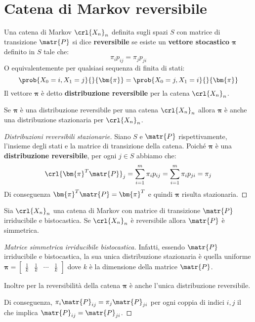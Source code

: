 \documentclass[\main/main.tex]{subfiles}
\begin{document}
\section{Catena di Markov reversibile}
\begin{definition}
  Una catena di Markov \(\crl{X_n}_n\) definita sugli spazi \(S\) con matrice di transizione \(\matr{P}\) si dice \textbf{reversibile} se esiste un \textbf{vettore stocastico} \(\bm{\pi} \) definito in \(S\) tale che:
  \[
    \pi_i p_{ij} = \pi_j p_{ji}
  \]
  O equivalentemente per qualsiasi sequenza di finita di stati:
  \[
    \prob{X_0 = i, X_1 = j}{}{\bm{\pi}} = \prob{X_0 = j, X_1 = i}{}{\bm{\pi}}
  \]
  Il vettore \(\bm{\pi} \) è detto \textbf{distribuzione reversibile} per la catena \(\crl{X_n}_n\).
\end{definition}

\begin{theorem}
  Se \(\bm{\pi} \) è una distribuzione reversibile per una catena \(\crl{X_n}_n\) allora \(\bm{\pi} \) è anche una distribuzione stazionaria per \(\crl{X_n}_n\).
\end{theorem}
\begin{proof}[Distribuzioni reversibili stazionarie]
  Siano \(S\) e \(\matr{P}\) rispettivamente, l'insieme degli stati e la matrice di transizione della catena. Poiché \(\bm{\pi} \) è una \textbf{distribuzione reversibile}, per ogni \(j \in S\) abbiamo che:
  \[
    \crl{\bm{\pi}^T \matr{P}}_j = \sum_{i=1}^m \pi_i p_{ij} = \sum_{i=1}^m \pi_i p_{ji} = \pi_j
  \]
  Di conseguenza \(\bm{\pi}^T \matr{P} = \bm{\pi}^T\) e quindi \(\bm{\pi} \) risulta stazionaria.
\end{proof}

\begin{theorem}
  Sia \(\crl{X_n}_n\) una catena di Markov con matrice di transizione \(\matr{P}\) irriducibile e bistocastica. Se \(\crl{X_n}_n\) è reversibile allora \(\matr{P}\) è simmetrica.
\end{theorem}
\begin{proof}[Matrice simmetrica irriducibile bistocastica]
  Infatti, essendo \(\matr{P}\) irriducibile e bistocastica, la sua unica distribuzione stazionaria è quella uniforme \(\bm{\pi} = \begin{bmatrix}
    \frac{1}{k} & \frac{1}{k} & \cdots & \frac{1}{k}
  \end{bmatrix}\) dove \(k\) è la dimensione della matrice \(\matr{P}\).

  Inoltre per la reversibilità della catena \(\bm{\pi} \) è anche l'unica distribuzione reversibile.

  Di conseguenza, \(\pi_i \matr{P}_{ij} = \pi_j \matr{P}_{ji}\) per ogni coppia di indici \(i,j\) il che implica \(\matr{P}_{ij} = \matr{P}_{ji}\).
\end{proof}
\end{document}
